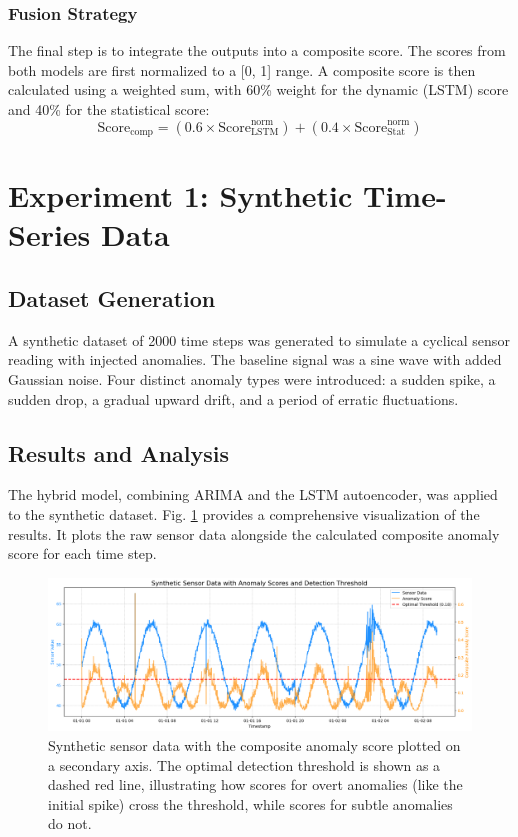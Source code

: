 \documentclass[conference]{IEEEtran}
\begin{document}
\subsubsection{Fusion Strategy}
The final step is to integrate the outputs into a composite score. The scores from both models are first normalized to a [0, 1] range. A composite score is then calculated using a weighted sum, with 60\% weight for the dynamic (LSTM) score and 40\% for the statistical score:
\begin{equation}
\text{Score}_{\text{comp}} = (0.6 \times \text{Score}_{\text{LSTM}}^{\text{norm}}) + (0.4 \times \text{Score}_{\text{Stat}}^{\text{norm}})
\label{eq:fusion}
\end{equation}

\section{Experiment 1: Synthetic Time-Series Data}

\subsection{Dataset Generation}
A synthetic dataset of 2000 time steps was generated to simulate a cyclical sensor reading with injected anomalies. The baseline signal was a sine wave with added Gaussian noise. Four distinct anomaly types were introduced: a sudden spike, a sudden drop, a gradual upward drift, and a period of erratic fluctuations.

\subsection{Results and Analysis}
The hybrid model, combining ARIMA and the LSTM autoencoder, was applied to the synthetic dataset. Fig. \ref{fig:threshold_data} provides a comprehensive visualization of the results. It plots the raw sensor data alongside the calculated composite anomaly score for each time step.

\begin{figure}[!t]
\centering
\includegraphics[width=\columnwidth]{Threshold_Data.png}
\caption{Synthetic sensor data with the composite anomaly score plotted on a secondary axis. The optimal detection threshold is shown as a dashed red line, illustrating how scores for overt anomalies (like the initial spike) cross the threshold, while scores for subtle anomalies do not.}
\label{fig:threshold_data}
\end{figure}
\end{document}
